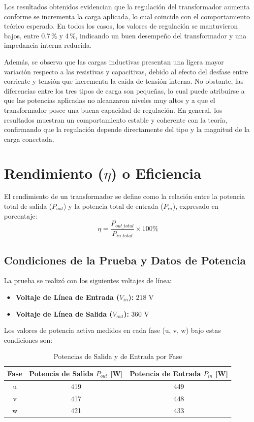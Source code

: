 Los resultados obtenidos evidencian que la regulación del transformador aumenta conforme se incrementa la carga aplicada, lo cual coincide con el comportamiento teórico esperado. En todos los casos, los valores de regulación se mantuvieron bajos, entre 0.7\,\% y 4\,\%, indicando un buen desempeño del transformador y una impedancia interna reducida. 

Además, se observa que las cargas inductivas presentan una ligera mayor variación respecto a las resistivas y capacitivas, debido al efecto del desfase entre corriente y tensión que incrementa la caída de tensión interna. No obstante, las diferencias entre los tres tipos de carga son pequeñas, lo cual puede atribuirse a que las potencias aplicadas no alcanzaron niveles muy altos y a que el transformador posee una buena capacidad de regulación. En general, los resultados muestran un comportamiento estable y coherente con la teoría, confirmando que la regulación depende directamente del tipo y la magnitud de la carga conectada.


\section{Rendimiento ($\eta$) o Eficiencia}

El rendimiento de un transformador se define como la relación entre la potencia total de salida ($P_{out}$) y la potencia total de entrada ($P_{in}$), expresado en porcentaje:
$$\eta = \frac{P_{out\_total}}{P_{in\_total}} \times 100\%$$

\subsection{Condiciones de la Prueba y Datos de Potencia}

La prueba se realizó con los siguientes voltajes de línea:
\begin{itemize}
    \item \textbf{Voltaje de Línea de Entrada ($V_{in}$):} $218 \text{ V}$
    \item \textbf{Voltaje de Línea de Salida ($V_{out}$):} $360 \text{ V}$
\end{itemize}

Los valores de potencia activa medidos en cada fase (u, v, w) bajo estas condiciones son:

\begin{table}[h]
    \centering
    \caption{Potencias de Salida y de Entrada por Fase}
    \begin{tabular}{|c|c|c|}
        \hline
        \textbf{Fase} & \textbf{Potencia de Salida $P_{out}$ [W]} & \textbf{Potencia de Entrada $P_{in}$ [W]} \\
        \hline
        u & 419 & 449 \\
        \hline
        v & 417 & 448 \\
        \hline
        w & 421 & 433 \\
        \hline
    \end{tabular}
\end{table}

